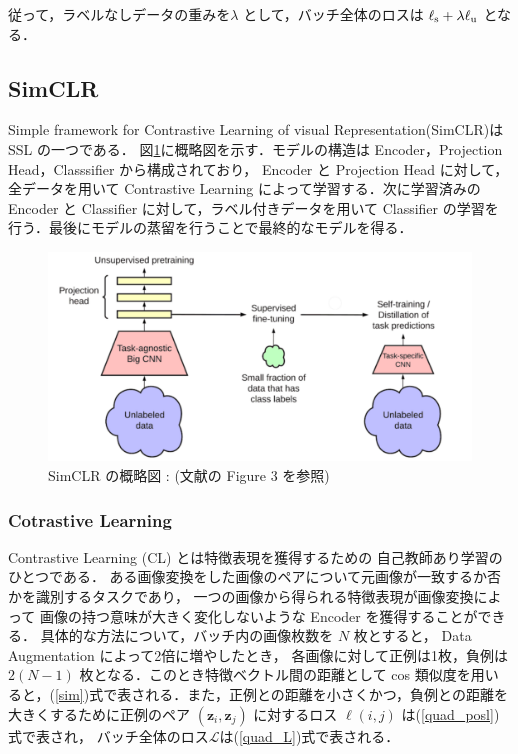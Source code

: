 従って，ラベルなしデータの重みを$\lambda$	として，バッチ全体のロスは ${\ell}_{\rm s}+\lambda {\ell}_{\rm u}$ となる．

\changeindent{0cm}
\subsection{SimCLR}
\changeindent{2cm}
Simple framework for Contrastive Learning of visual Representation(SimCLR)\cite{chen2020simple}は SSL の一つである．
図\ref{fig:SimCLR}に概略図を示す．モデルの構造は Encoder，Projection Head，Classsifier
から構成されており， Encoder と Projection Head に対して，全データを用いて Contrastive Learning によって学習する．次に学習済みの Encoder と Classifier に対して，ラベル付きデータを用いて Classifier の学習を行う．最後にモデルの蒸留\cite{hinton2015distilling}を行うことで最終的なモデルを得る．

\begin{figure}[h]
	\begin{center}
		\includegraphics[scale=1.0]{./images/SimCLR.png}
		\caption[SimCLR の概略図]
		{SimCLR の概略図 : (文献\cite{chen2020big}の Figure 3 を参照\label{fig:SimCLR})}
	\end{center}
\end{figure}

\changeindent{0cm}
\subsubsection{Cotrastive Learning}
\changeindent{2cm}
Contrastive Learning (CL)\cite{tian2020makes} とは特徴表現を獲得するための
自己教師あり学習\cite{doersch2017multi}のひとつである．
ある画像変換をした画像のペアについて元画像が一致するか否かを識別するタスクであり，
一つの画像から得られる特徴表現が画像変換によって
画像の持つ意味が大きく変化しないような Encoder を獲得することができる．
具体的な方法について，バッチ内の画像枚数を $N$ 枚とすると， Data Augmentation によって2倍に増やしたとき，
各画像に対して正例は1枚，負例は $2(N-1)$ 枚となる．このとき特徴ベクトル間の距離として cos 類似度を用いると，(\ref{sim})式で表される．また，正例との距離を小さくかつ，負例との距離を大きくするために正例のペア $({\bm z}_i,{\bm z}_j)$ に対するロス $\ell(i, j)$ は(\ref{quad_posl})式で表され，
バッチ全体のロス$\mathcal L$は(\ref{quad_L})式で表される．

